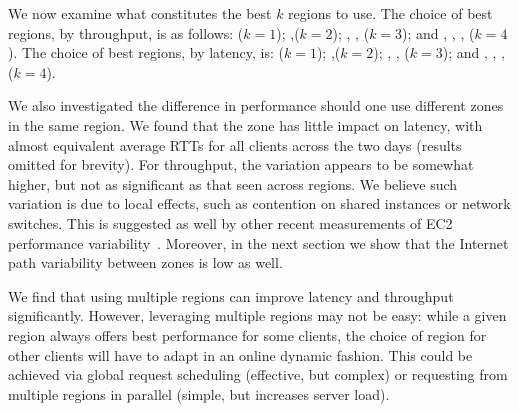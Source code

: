 We now examine what constitutes the best $k$ regions to use. The
choice of best regions, by throughput, is as follows: \awseast
($k=1$); \awseast ,\awseuro($k=2$); \awseast, \awseuro, \awscali
($k=3$); and \awseast, \awseuro, \awscali, \awssing ($k=4$).
The choice of best regions, by latency, is: \awseast
($k=1$); \awseast,\awstokyo ($k=2$); \awseast, \awstokyo, \awscali
($k=3$); and \awseast, \awstokyo, \awscali, \awssing ($k=4$).



 We also investigated the
difference in performance should one use different zones in the
same region. %
We found that the zone has
little impact on latency, with almost equivalent average RTTs for all
clients across the two days (results omitted for brevity). For throughput, the variation appears to
be somewhat higher, but not as significant as that seen across
regions. %
We believe such variation is due to local
effects, such as contention on shared instances or network
switches. %
This is suggested as well by other
recent measurements of EC2 performance
variability~\cite{farley:gaming:socc:2012}.  Moreover, in the next
section we show that the Internet path variability between zones is
low as well.

 We find that using multiple
regions can improve latency and throughput significantly. However,
leveraging multiple regions may not be easy: while a given region
always offers best performance for some clients, the choice of region
for other clients will have to adapt in an online dynamic
fashion. This could be achieved via global request scheduling (effective,
but complex) or requesting from multiple regions in parallel (simple,
but increases server load).

